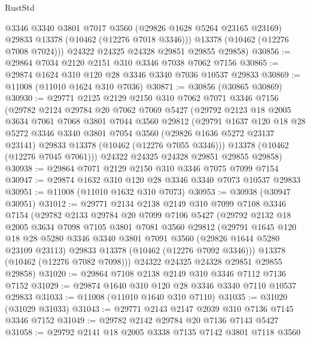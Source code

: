 \begin{lexlean}{RustStd}
\begin{coremodule}
          @3346
          @3340
          @3801
          @7017
          @3560
          (@29826 @1628 @5264 @23165 @23169)
          @29833
          @13378
          (@10462 (@12276 @7018 @3346)))
        @13378
        (@10462 (@12276 @7008 @7024)))
      @24322
      @24325
      @24328
      @29851
      @29855
      @29858)
@30856 := @29864 @7034 @2120 @2151 @310 @3346 @7038 @7062 @7156
@30865 := @29874 @1624 @310 @120 @28 @3346 @3340 @7036 @10537 @29833
@30869 := @11008 (@11010 @1624 @310 @7036)
@30871 := @30856 (@30865 @30869)
@30930 := @29771
    @2125
    @2129
    @2150
    @310
    @7062
    @7071
    @3346
    @7156
    (@29782
      @2124
      @29784
      @20
      @7062
      @7069
      @5427
      (@29792
        @2123
        @18
        @2005
        @3634
        @7061
        @7068
        @3801
        @7044
        @3560
        @29812
        (@29791
          @1637
          @120
          @18
          @28
          @5272
          @3346
          @3340
          @3801
          @7054
          @3560
          (@29826 @1636 @5272 @23137 @23141)
          @29833
          @13378
          (@10462 (@12276 @7055 @3346)))
        @13378
        (@10462 (@12276 @7045 @7061)))
      @24322
      @24325
      @24328
      @29851
      @29855
      @29858)
@30938 := @29864 @7071 @2129 @2150 @310 @3346 @7075 @7099 @7154
@30947 := @29874 @1632 @310 @120 @28 @3346 @3340 @7073 @10537 @29833
@30951 := @11008 (@11010 @1632 @310 @7073)
@30953 := @30938 (@30947 @30951)
@31012 := @29771
    @2134
    @2138
    @2149
    @310
    @7099
    @7108
    @3346
    @7154
    (@29782
      @2133
      @29784
      @20
      @7099
      @7106
      @5427
      (@29792
        @2132
        @18
        @2005
        @3634
        @7098
        @7105
        @3801
        @7081
        @3560
        @29812
        (@29791
          @1645
          @120
          @18
          @28
          @5280
          @3346
          @3340
          @3801
          @7091
          @3560
          (@29826 @1644 @5280 @23109 @23113)
          @29833
          @13378
          (@10462 (@12276 @7092 @3346)))
        @13378
        (@10462 (@12276 @7082 @7098)))
      @24322
      @24325
      @24328
      @29851
      @29855
      @29858)
@31020 := @29864 @7108 @2138 @2149 @310 @3346 @7112 @7136 @7152
@31029 := @29874 @1640 @310 @120 @28 @3346 @3340 @7110 @10537 @29833
@31033 := @11008 (@11010 @1640 @310 @7110)
@31035 := @31020 (@31029 @31033)
@31043 := @29771 @2143 @2147 @2039 @310 @7136 @7145 @3346 @7152
@31049 := @29782 @2142 @29784 @20 @7136 @7143 @5427
@31058 := @29792 @2141 @18 @2005 @3338 @7135 @7142 @3801 @7118 @3560

\end{coremodule}
\end{lexlean}
